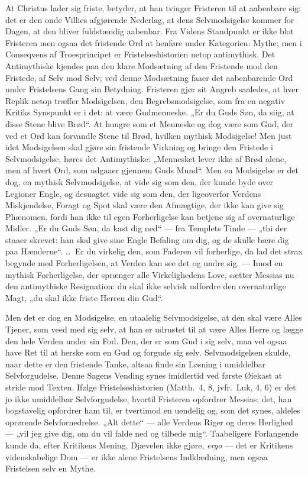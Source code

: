 \documentclass[12pt]{book}
\begin{document}
At Christus lader sig friste, betyder, at han tvinger Fristeren til
at aabenbare sig: det er den onde Villies afgjørende Nederlag, at
dens Selvmodsigelse kommer for Dagen, at den bliver fuldstændig
aabenbar. Fra Videns Standpunkt er ikke blot Fristeren men ogsaa det
fristende Ord at henføre under Kategorien: Mythe; men i Conseqvens
af Troesprincipet er Fristelseshistorien netop antimythisk. Det
Antimythiske kjendes paa den klare Modsætning af den Fristende mod
den Fristede, af Selv mod Selv; ved denne Modsætning faaer det
aabenbarende Ord under Fristelsens Gang sin Betydning. Fristeren
gjør sit Angreb saaledes, at hver Replik netop træffer Modsigelsen,
den Begrebsmodsigelse, som fra en negativ Kritiks Synspunkt er i
det: at være Gudmenneske. „Er du Guds Søn, da siig, at disse Stene
blive Brød“. At hungre som et Menneske og dog være som Gud, der ved
et Ord kan forvandle Stene til Brød, hvilken mythisk Modsigelse! Men
just idet Modsigelsen skal gjøre sin fristende Virkning og bringe
den Fristede i Selvmodsigelse, høres det Antimythiske: „Mennesket
lever ikke af Brød alene, men af hvert Ord, som udgaaer gjennem Guds
Mund“. Men en Modsigelse er det dog, en mythisk Selvmodsigelse, at
vide sig som den, der kunde byde over Legioner Engle, og desuagtet
vide sig som den, der ligeoverfor Verdens Miskjendelse, Foragt og
Spot skal være den Afmægtige, der ikke kan give sig Phænomen, fordi
han ikke til egen Forherligelse kan betjene sig af overnaturlige
Midler. „Er du Guds Søn, da kast dig ned“ --- fra Templets Tinde ---
„thi der staaer skrevet: han skal give sine Engle Befaling om dig,
og de skulle bære dig paa Hænderne“. \dots\ Er du virkelig den, som
Faderen vil forherlige, da lad det strax begynde med Forherligelsen,
at Verden kan see det og undre sig. --- Imod en mythisk
Forherligelse, der sprænger alle Virkelighedens Love, sætter Messias
nu den antimythiske Resignation: du skal ikke selvisk udfordre den
overnaturlige Magt, „du skal ikke friste Herren din Gud“.

Men det er dog en Modsigelse, en utaalelig Selvmodsigelse, at den
skal være Alles Tjener, som veed med sig selv, at han er udrustet
til at være Alles Herre og lægge den hele Verden under sin Fod. Den,
der er som Gud i sig selv, maa vel ogsaa have Ret til at herske som
en Gud og forgude sig selv. Selvmodsigelsen skulde, naar dette er
den fristende Tanke, altsaa finde sin Løsning i umiddelbar
Selvforgudelse. Denne Sagens Vending synes imidlertid ved første
Øiekast at stride mod Texten. Ifølge Fristelseshistorien (Matth.\ 4,
8, jvfr.\ Luk, 4, 6) er det jo ikke umiddelbar Selvforgudelse,
hvortil Fristeren opfordrer Messias; det, han bogstavelig opfordrer
ham til, er tvertimod en uendelig og, som det synes, aldeles
oprørende Selvfornedrelse. „Alt dette“ --- alle Verdens Riger og
deres Herlighed --- „vil jeg give dig, om du vil falde ned og
tilbede mig“. Taabeligere Forlangende kunde da, efter Kritikens
Mening, Djævelen ikke gjøre, \textit{ergo} --- det er Kritikens
videnskabelige Dom --- er ikke alene Fristelsens Indklædning, men
ogsaa Fristelsen selv en Mythe.
\end{document}
